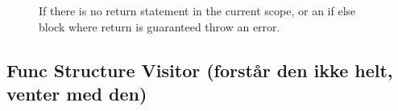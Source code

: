  \begin{figure}[H]
\centering
{}
\caption{If there is no return statement in the current scope, or an if else block where return is guaranteed throw an error.}
\label{lf05}
\end{figure}



\subsection{Func Structure Visitor (forstår den ikke helt, venter med den)}